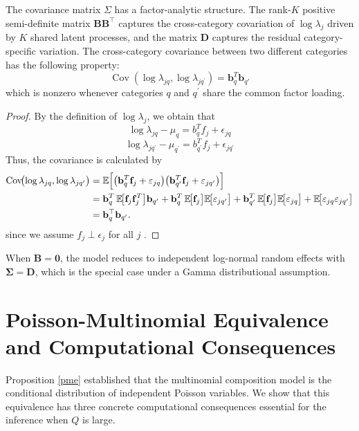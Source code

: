 \documentclass[]{report}
\theoremstyle{definition}
\begin{document}
The covariance matrix $\Sigma$ has a factor-analytic structure. The rank-$K$  positive semi-definite matrix $\mathbf{B}\mathbf{B}^{\top}$  captures the cross-category covariation of $\log \lambda_{j}$  driven by $K$  shared latent processes, and the matrix $\mathbf{D}$  captures the residual category-specific variation. The cross-category covariance between two different categories has the following property:
    \begin{equation}
    \operatorname{Cov}(\log \lambda_{jq}, \log \lambda_{jq^{'}})=\mathbf{b}_q^T\mathbf{b}_{q'}
    \end{equation}
which is nonzero whenever categories $q$  and $q^{'}$  share the common factor loading.
\begin{proof}
By the definition of $\log \lambda_{j}$, we obtain that 
\[\log \lambda_{jq}-\mu_{q}=b^{T}_{q}f_{j}+\epsilon_{jq}\]
\[\log \lambda_{jq^{'}}-\mu_{q^{'}}=b^{T}_{q^{'}}f_{j}+\epsilon_{jq^{'}}\]
Thus, the covariance is calculated by
\[
\begin{aligned}
\operatorname{Cov}\!\bigl(\log \lambda_{jq}, \log \lambda_{jq'}\bigr)
&= \mathbb{E}\Bigl[\bigl(\mathbf{b}_q^{T}\mathbf{f}_j + \varepsilon_{jq}\bigr)
\bigl(\mathbf{b}_{q'}^{T}\mathbf{f}_j + \varepsilon_{jq'}\bigr)\Bigr] \\
&= \mathbf{b}_q^{T}\,\mathbb{E}\!\bigl[\mathbf{f}_j \mathbf{f}_j^{T}\bigr]\mathbf{b}_{q'}
 + \mathbf{b}_q^{T}\,\mathbb{E}\!\bigl[\mathbf{f}_j\bigr]\mathbb{E}\!\bigl[\varepsilon_{jq'}\bigr]
 + \mathbf{b}_{q'}^{T}\,\mathbb{E}\!\bigl[\mathbf{f}_j\bigr]\mathbb{E}\!\bigl[\varepsilon_{jq}\bigr]
 + \mathbb{E}\!\bigl[\varepsilon_{jq}\varepsilon_{jq'}\bigr] \\
&= \mathbf{b}_q^{\top}\mathbf{b}_{q'} .
\end{aligned}
\]
since we assume  $f_{j}\perp \epsilon_{j}$  for all $j$ . 
\end{proof}
When $\mathbf{B}=\mathbf{0}$, the model reduces to independent log-normal random effects with $\mathbf{\Sigma}=\mathbf{D}$, which is the special case under a Gamma distributional assumption. 
\section{Poisson-Multinomial Equivalence and Computational Consequences}
    \label{equivalence}
Proposition \ref{pme} established that the multinomial composition model is the conditional distribution of independent Poisson variables. We show that this equivalence has three concrete computational consequences essential for the inference when $Q$ is large.
\end{document}

